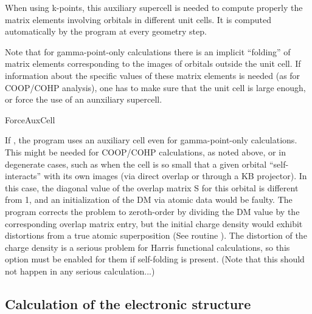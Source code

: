 When using k-points, this auxiliary supercell is needed to compute properly
the matrix elements involving orbitals in different unit cells.
It is computed automatically by the program at every geometry step.

Note that for gamma-point-only calculations there is an implicit
``folding'' of matrix elements corresponding to the images of orbitals
outside the unit cell. If information about the specific values of
these matrix elements is needed (as for COOP/COHP analysis), one has
to make sure that the unit cell is large enough, or force the use
of an aunxiliary supercell.
 
\begin{fdflogicalF}{ForceAuxCell}

If \fdftrue, the program uses an auxiliary cell even for gamma-point-only
calculations. This might be needed for COOP/COHP calculations, as
noted above,  or in degenerate cases, such as when the cell is so
small that a given orbital ``self-interacts'' with its own images (via
direct overlap or through a KB projector). In this case, the diagonal
value of the overlap matrix S for this orbital is different from 1, and an
initialization of the DM via atomic data would be faulty. The
program corrects the problem to zeroth-order by dividing the DM value
by the corresponding overlap matrix entry, but the initial charge
density would exhibit distortions from a true atomic superposition
(See routine ). The distortion of the charge density
is a serious problem for Harris functional calculations, so this
option must be enabled for them if self-folding is present. (Note that
this should not happen in any serious calculation...)

\end{fdflogicalF}



\subsection{Calculation of the electronic structure}


